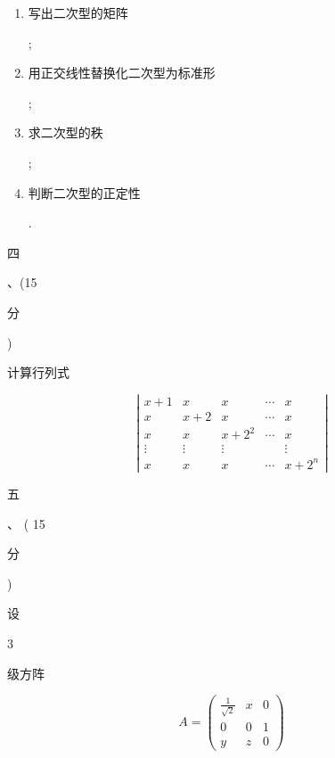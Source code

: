 \documentclass[10pt]{article}
\begin{document}
\begin{enumerate}
  \item \begin{CJK}{UTF8}{mj}写出二次型的矩阵\end{CJK};

  \item \begin{CJK}{UTF8}{mj}用正交线性替换化二次型为标准形\end{CJK};

  \item \begin{CJK}{UTF8}{mj}求二次型的秩\end{CJK};

  \item \begin{CJK}{UTF8}{mj}判断二次型的正定性\end{CJK}.

\end{enumerate}
\begin{CJK}{UTF8}{mj}四\end{CJK}、(15 \begin{CJK}{UTF8}{mj}分\end{CJK}) \begin{CJK}{UTF8}{mj}计算行列式\end{CJK}
$$
\left|\begin{array}{ccccc}
x+1 & x & x & \cdots & x \\
x & x+2 & x & \cdots & x \\
x & x & x+2^{2} & \cdots & x \\
\vdots & \vdots & \vdots & & \vdots \\
x & x & x & \cdots & x+2^{n}
\end{array}\right|
$$
\begin{CJK}{UTF8}{mj}五\end{CJK}、 ( 15 \begin{CJK}{UTF8}{mj}分\end{CJK}) \begin{CJK}{UTF8}{mj}设\end{CJK} 3 \begin{CJK}{UTF8}{mj}级方阵\end{CJK}
$$
A=\left(\begin{array}{ccc}
\frac{1}{\sqrt{2}} & x & 0 \\
0 & 0 & 1 \\
y & z & 0
\end{array}\right)
$$
\end{document}
